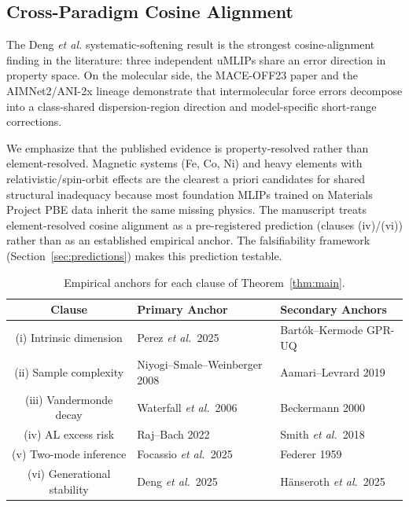 \subsection{Cross-Paradigm Cosine Alignment}\label{sec:cosine}

The Deng \emph{et al.}\cite{deng2025systematic} systematic-softening result is the strongest cosine-alignment finding in the literature: three independent uMLIPs share an error direction in property space. On the molecular side, the MACE-OFF23 paper\cite{kovacs2025maceoff23} and the AIMNet2\cite{zesew2022aimnet2}/ANI-2x\cite{smith2019ani2x} lineage demonstrate that intermolecular force errors decompose into a class-shared dispersion-region direction and model-specific short-range corrections.

We emphasize that the published evidence is property-resolved rather than element-resolved. Magnetic systems (Fe, Co, Ni) and heavy elements with relativistic/spin-orbit effects are the clearest a priori candidates for shared structural inadequacy because most foundation MLIPs trained on Materials Project PBE data inherit the same missing physics. The manuscript treats element-resolved cosine alignment as a pre-registered prediction (clauses (iv)/(vi)) rather than as an established empirical anchor. The falsifiability framework (Section~\ref{sec:predictions}) makes this prediction testable.

\begin{table}[htbp]
\centering
\caption{Empirical anchors for each clause of Theorem~\ref{thm:main}.}
\label{tab:empirical-anchors}
\begin{tabular}{@{}cll@{}}
\toprule
\textbf{Clause} & \textbf{Primary Anchor} & \textbf{Secondary Anchors} \\
\midrule
(i) Intrinsic dimension & Perez \emph{et al.}\ 2025\cite{perez2025misspecified} & Bartók--Kermode GPR-UQ\cite{bartok2022gap} \\
(ii) Sample complexity & Niyogi--Smale--Weinberger 2008\cite{niyogi2008finding} & Aamari--Levrard 2019\cite{aamari2019nonasymptotic} \\
(iii) Vandermonde decay & Waterfall \emph{et al.}\ 2006\cite{waterfall2006sloppy} & Beckermann 2000\cite{beckermann2000condition} \\
(iv) AL excess risk & Raj--Bach 2022\cite{raj2022convergence} & Smith \emph{et al.}\ 2018\cite{smith2018less} \\
(v) Two-mode inference & Focassio \emph{et al.}\ 2025\cite{focassio2025surfaces} & Federer 1959\cite{federer1959curvature} \\
(vi) Generational stability & Deng \emph{et al.}\ 2025\cite{deng2025systematic} & Hänseroth \emph{et al.}\ 2025\cite{hanseroth2025finetuning} \\
\bottomrule
\end{tabular}
\end{table}

